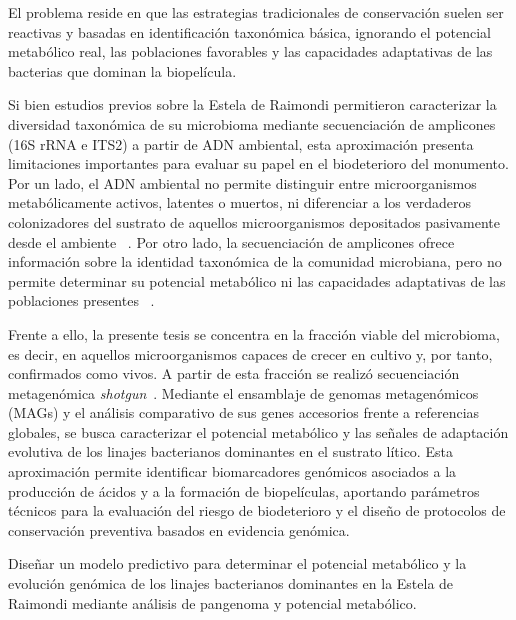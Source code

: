 El problema reside en que las estrategias tradicionales de conservación suelen ser reactivas y basadas en identificación taxonómica básica, ignorando el potencial metabólico real, las poblaciones favorables y las capacidades adaptativas de las bacterias que dominan la biopelícula.


Si bien estudios previos sobre la Estela de Raimondi permitieron caracterizar la diversidad taxonómica de su microbioma mediante secuenciación de amplicones (16S rRNA e ITS2) a partir de ADN ambiental, esta aproximación presenta limitaciones importantes para evaluar su papel en el biodeterioro del monumento. Por un lado, el ADN ambiental no permite distinguir entre microorganismos metabólicamente activos, latentes o muertos, ni diferenciar a los verdaderos colonizadores del sustrato de aquellos microorganismos depositados pasivamente desde el ambiente ~\cite{skipper2022,branysova2022}. Por otro lado, la secuenciación de amplicones ofrece información sobre la identidad taxonómica de la comunidad microbiana, pero no permite determinar su potencial metabólico ni las capacidades adaptativas de las poblaciones presentes ~\cite{PitaGaleana2025}.

Frente a ello, la presente tesis se concentra en la fracción viable del microbioma, es decir, en aquellos microorganismos capaces de crecer en cultivo y, por tanto, confirmados como vivos. A partir de esta fracción se realizó secuenciación metagenómica \textit{shotgun}~\cite{tsukayama2025informe}. Mediante el ensamblaje de genomas metagenómicos (MAGs) y el análisis comparativo de sus genes accesorios frente a referencias globales, se busca caracterizar el potencial metabólico y las señales de adaptación evolutiva de los linajes bacterianos dominantes en el sustrato lítico. Esta aproximación permite identificar biomarcadores genómicos asociados a la producción de ácidos y a la formación de biopelículas, aportando parámetros técnicos para la evaluación del riesgo de biodeterioro y el diseño de protocolos de conservación preventiva basados en evidencia genómica.



Diseñar un modelo predictivo para determinar el potencial metabólico y la evolución genómica de los linajes bacterianos dominantes en la Estela de Raimondi mediante análisis de pangenoma y potencial metabólico.

